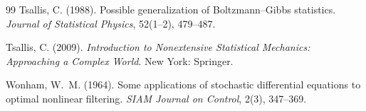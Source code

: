 \documentclass[11pt,a4paper]{article}
\theoremstyle{remark}
\begin{document}
\begin{thebibliography}{99}
Tsallis, C. (1988). Possible generalization of Boltzmann--Gibbs statistics. \emph{Journal of
Statistical Physics}, 52(1--2), 479--487.

Tsallis, C. (2009). \emph{Introduction to Nonextensive Statistical Mechanics: Approaching a
Complex World}. New York: Springer.

Wonham, W.~M. (1964). Some applications of stochastic differential equations to optimal
nonlinear filtering. \emph{SIAM Journal on Control}, 2(3), 347--369.

\end{thebibliography}
\end{document}
